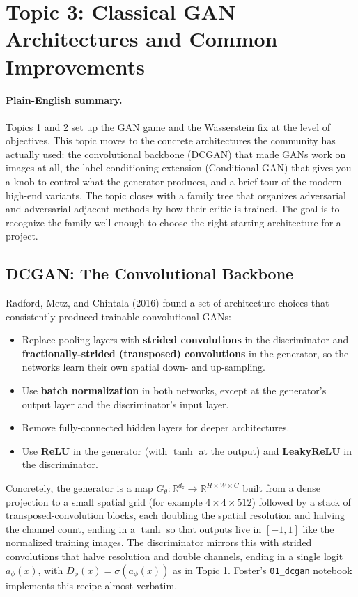 \documentclass[11pt]{article}
\newcommand{\R}{\mathbb{R}}
\theoremstyle{remark}
\begin{document}
\section{Topic 3: Classical GAN Architectures and Common Improvements}

\paragraph{Plain-English summary.}
Topics 1 and 2 set up the GAN game and the Wasserstein fix at the level of objectives. This topic moves to the concrete architectures the community has actually used: the convolutional backbone (DCGAN) that made GANs work on images at all, the label-conditioning extension (Conditional GAN) that gives you a knob to control what the generator produces, and a brief tour of the modern high-end variants. The topic closes with a family tree that organizes adversarial and adversarial-adjacent methods by how their critic is trained. The goal is to recognize the family well enough to choose the right starting architecture for a project.

\subsection{DCGAN: The Convolutional Backbone}

Radford, Metz, and Chintala (2016) found a set of architecture choices that consistently produced trainable convolutional GANs:
\begin{itemize}
    \item Replace pooling layers with \textbf{strided convolutions} in the discriminator and \textbf{fractionally-strided (transposed) convolutions} in the generator, so the networks learn their own spatial down- and up-sampling.
    \item Use \textbf{batch normalization} in both networks, except at the generator's output layer and the discriminator's input layer.
    \item Remove fully-connected hidden layers for deeper architectures.
    \item Use \textbf{ReLU} in the generator (with $\tanh$ at the output) and \textbf{LeakyReLU} in the discriminator.
\end{itemize}
Concretely, the generator is a map $G_\theta:\R^{d_z}\to\R^{H\times W\times C}$ built from a dense projection to a small spatial grid (for example $4\times 4\times 512$) followed by a stack of transposed-convolution blocks, each doubling the spatial resolution and halving the channel count, ending in a $\tanh$ so that outputs live in $[-1,1]$ like the normalized training images. The discriminator mirrors this with strided convolutions that halve resolution and double channels, ending in a single logit $a_\phi(x)$, with $D_\phi(x)=\sigma(a_\phi(x))$ as in Topic 1. Foster's \texttt{01\_dcgan} notebook implements this recipe almost verbatim.
\end{document}
